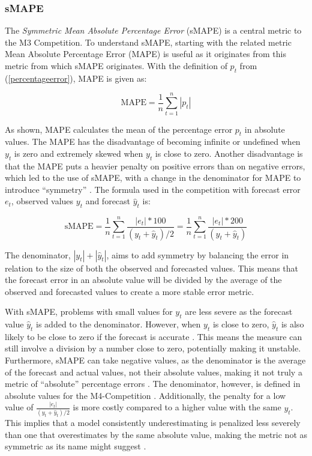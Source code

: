 \documentclass[12pt,a4paper]{article}
\begin{document}
\subsubsection{sMAPE}

The \textit{Symmetric Mean Absolute Percentage Error} (sMAPE) is a central metric to the M3 Competition. To understand sMAPE, starting with the related metric Mean Absolute Percentage Error (MAPE) is useful as it originates from this metric from which sMAPE originates. With the definition of $p_t$ from (\ref{percentageerror}), MAPE is given as: 

\begin{equation}
  \text{MAPE} = \frac{1}{n} \sum_{t=1}^{n} \left| p_t \right|
\end{equation}

As shown, MAPE calculates the mean of the percentage error \( p_t \) in absolute values. The MAPE has the disadvantage of becoming infinite or undefined when \( y_t \) is zero and extremely skewed when \( y_t \) is close to zero. Another disadvantage is that the MAPE puts a heavier penalty on positive errors than on negative errors, which led to the use of sMAPE, with a change in the denominator for MAPE to introduce “symmetry” \parencite[683]{HyndmanAccuracy2006}. The formula used in the competition with forecast error \( e_t \), observed values \( y_t \) and forecast \(\hat{y}_t\) is:

\begin{equation}
  \text{sMAPE} = \frac{1}{n} \sum_{t=1}^{n} \frac{\left| e_t \right| \ast 100}{( y_t + \hat{y}_t ) / 2}
  = \frac{1}{n} \sum_{t=1}^{n} \frac{\left| e_t \right| \ast 200}{( y_t + \hat{y}_t )}
\end{equation}

The denominator, ${\left| y_t \right| + \left| \hat{y}_t \right|}$, aims to add symmetry by balancing the error in relation to the size of both the observed and forecasted values. This means that the forecast error in an absolute value will be divided by the average of the observed and forecasted values to create a more stable error metric. 

With sMAPE, problems with small values for \( y_t \) are less severe as the forecast value \( \hat{y}_t \) is added to the denominator. However, when \( y_t \) is close to zero, \( \hat{y}_t \) is also likely to be close to zero if the forecast is accurate \parencite[683]{HyndmanAccuracy2006}. This means the measure can still involve a division by a number close to zero, potentially making it unstable. Furthermore, sMAPE can take negative values, as the denominator is the average of the forecast and actual values, not their absolute values, making it not truly a metric of “absolute” percentage errors \parencite{HyndmanForecasting2021}. The denominator, however, is defined in absolute values for the M4-Competition \parencite{Makridakis2019}. Additionally, the penalty for a low value of \( \frac{\left| e_t \right|}{( y_t + \hat{y}_t ) / 2} \) is more costly compared to a higher value with the same \( y_t \). This implies that a model consistently underestimating is penalized less severely than one that overestimates by the same absolute value, making the metric not as symmetric as its name might suggest \parencite{GoodwinSmape1999}.
\end{document}
